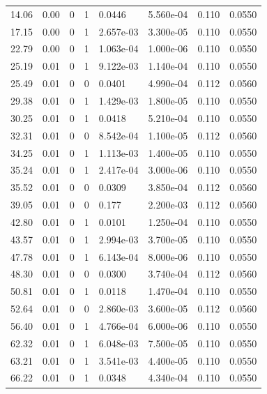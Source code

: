 \documentclass[preview]{standalone}
\begin{document}
{{\begin{tabular}{L{1.2cm}C{1.2cm} C{0.3cm}C{0.5cm} C{1.4cm}C{1.4cm} C{1.4cm}C{1.4cm}}
  14.06  &  0.00  & 0     &  1 &  0.0446  & 5.560e-04  & 0.110 &  0.0550   \\ 
  17.15  &  0.00  & 0     &  1 &  2.657e-03  & 3.300e-05  & 0.110 &  0.0550   \\ 
  22.79  &  0.00  & 0     &  1 &  1.063e-04  & 1.000e-06  & 0.110 &  0.0550   \\ 
  25.19  &  0.01  & 0     &  1 &  9.122e-03  & 1.140e-04  & 0.110 &  0.0550   \\ 
  25.49  &  0.01  & 0     &  0 &  0.0401  & 4.990e-04  & 0.112 &  0.0560   \\ 
  29.38  &  0.01  & 0     &  1 &  1.429e-03  & 1.800e-05  & 0.110 &  0.0550   \\ 
  30.25  &  0.01  & 0     &  1 &  0.0418  & 5.210e-04  & 0.110 &  0.0550   \\ 
  32.31  &  0.01  & 0     &  0 &  8.542e-04  & 1.100e-05  & 0.112 &  0.0560   \\ 
  34.25  &  0.01  & 0     &  1 &  1.113e-03  & 1.400e-05  & 0.110 &  0.0550   \\ 
  35.24  &  0.01  & 0     &  1 &  2.417e-04  & 3.000e-06  & 0.110 &  0.0550   \\ 
  35.52  &  0.01  & 0     &  0 &  0.0309  & 3.850e-04  & 0.112 &  0.0560   \\ 
  39.05  &  0.01  & 0     &  0 &  0.177  & 2.200e-03  & 0.112 &  0.0560   \\ 
  42.80  &  0.01  & 0     &  1 &  0.0101  & 1.250e-04  & 0.110 &  0.0550   \\ 
  43.57  &  0.01  & 0     &  1 &  2.994e-03  & 3.700e-05  & 0.110 &  0.0550   \\ 
  47.78  &  0.01  & 0     &  1 &  6.143e-04  & 8.000e-06  & 0.110 &  0.0550   \\ 
  48.30  &  0.01  & 0     &  0 &  0.0300  & 3.740e-04  & 0.112 &  0.0560   \\ 
  50.81  &  0.01  & 0     &  1 &  0.0118  & 1.470e-04  & 0.110 &  0.0550   \\ 
  52.64  &  0.01  & 0     &  0 &  2.860e-03  & 3.600e-05  & 0.112 &  0.0560   \\ 
  56.40  &  0.01  & 0     &  1 &  4.766e-04  & 6.000e-06  & 0.110 &  0.0550   \\ 
  62.32  &  0.01  & 0     &  1 &  6.048e-03  & 7.500e-05  & 0.110 &  0.0550   \\ 
  63.21  &  0.01  & 0     &  1 &  3.541e-03  & 4.400e-05  & 0.110 &  0.0550   \\ 
  66.22  &  0.01  & 0     &  1 &  0.0348  & 4.340e-04  & 0.110 &  0.0550   \\ 

\end{tabular}}}
\end{document}
